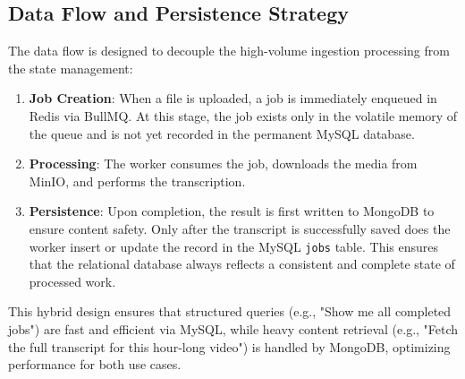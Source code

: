 \subsection{Data Flow and Persistence Strategy}

The data flow is designed to decouple the high-volume ingestion processing from the state management:

\begin{enumerate}
    \item \textbf{Job Creation}: When a file is uploaded, a job is immediately enqueued in Redis via BullMQ. At this stage, the job exists only in the volatile memory of the queue and is not yet recorded in the permanent MySQL database.
    \item \textbf{Processing}: The worker consumes the job, downloads the media from MinIO, and performs the transcription.
    \item \textbf{Persistence}: Upon completion, the result is first written to MongoDB to ensure content safety. Only after the transcript is successfully saved does the worker insert or update the record in the MySQL \texttt{jobs} table. This ensures that the relational database always reflects a consistent and complete state of processed work.
\end{enumerate}

This hybrid design ensures that structured queries (e.g., "Show me all completed jobs") are fast and efficient via MySQL, while heavy content retrieval (e.g., "Fetch the full transcript for this hour-long video") is handled by MongoDB, optimizing performance for both use cases.
